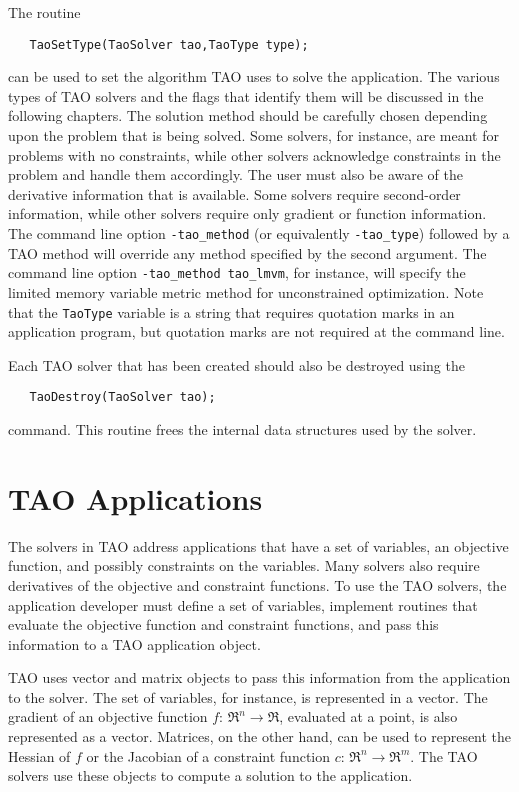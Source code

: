 The routine
\begin{verbatim}
   TaoSetType(TaoSolver tao,TaoType type);
\end{verbatim}
\noindent
can be used to set the algorithm TAO uses to solve the application.
The various types of TAO solvers and the flags that identify them 
will be discussed in the following chapters.
The solution method should be carefully chosen depending upon
the problem that is being solved.  Some solvers, for instance, are meant for
problems with no constraints, while other solvers acknowledge constraints
in the problem and handle them accordingly.
The user must also be aware of the derivative information that is available.
Some solvers require second-order information, while other solvers require
only gradient or function information.
The command line option \texttt{-tao\_method} (or equivalently 
\texttt{-tao\_type}) followed by a TAO method
will override any method specified by the second argument.
The command line option {\tt -tao\_method tao\_lmvm}, for instance,
will specify the limited memory variable metric method for unconstrained
optimization.  Note that the {\tt TaoType} variable is a string that requires
quotation marks in an application program, but quotation marks are not required
at the command line.

Each TAO solver that has been created should also be destroyed using
the  
\begin{verbatim}
   TaoDestroy(TaoSolver tao);
\end{verbatim}
command. 
This routine frees the internal data structures used by the solver.


\section{TAO Applications}
\label{section:taoapplication}
\label{section:petscapp}

The solvers in TAO address applications that have a set of variables, an objective
function, and possibly constraints on the variables.  Many solvers also
require derivatives
of the objective and constraint functions.
To use the TAO solvers, the application developer must 
define a set of variables, implement routines that evaluate the 
objective function and constraint functions, and pass this information
to a TAO application object.   

TAO uses vector and matrix objects to pass this information from the
application to the solver.   The set of variables, for instance, is
represented in a vector.
The gradient of an objective function $f: \, \Re^n \to \Re$,
evaluated at a point, is also represented as a vector.
Matrices,  on the other hand,
can be used to represent the Hessian of $f$ or the Jacobian of a constraint
function $c: \, \Re^n \to \Re^m$.  The TAO solvers use
these objects to compute a solution to the application.

